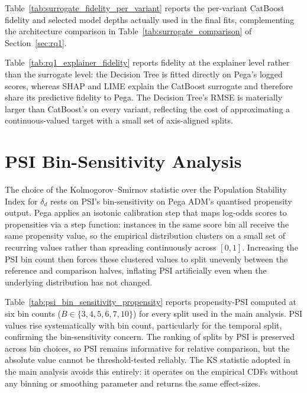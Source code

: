 \documentclass[oneside]{memoir} %
\begin{document}
Table~\ref{tab:surrogate_fidelity_per_variant} reports the per-variant CatBoost fidelity and selected model depths actually used in the final fits, complementing the architecture comparison in Table~\ref{tab:surrogate_comparison} of Section~\ref{sec:rq1}.



Table~\ref{tab:rq1_explainer_fidelity} reports fidelity at the explainer level rather than the surrogate level: the Decision Tree is fitted directly on Pega's logged scores, whereas SHAP and LIME explain the CatBoost surrogate and therefore share its predictive fidelity to Pega. The Decision Tree's RMSE is materially larger than CatBoost's on every variant, reflecting the cost of approximating a continuous-valued target with a small set of axis-aligned splits.



\section{PSI Bin-Sensitivity Analysis} \label{app:psi_sensitivity}

The choice of the Kolmogorov--Smirnov statistic over the Population Stability Index for $\delta_d$ rests on PSI's bin-sensitivity on Pega ADM's quantised propensity output. Pega applies an isotonic calibration step that maps log-odds scores to propensities via a step function: instances in the same score bin all receive the same propensity value, so the empirical distribution clusters on a small set of recurring values rather than spreading continuously across $[0, 1]$. Increasing the PSI bin count then forces these clustered values to split unevenly between the reference and comparison halves, inflating PSI artificially even when the underlying distribution has not changed.

Table~\ref{tab:psi_bin_sensitivity_propensity} reports propensity-PSI computed at six bin counts ($B \in \{3, 4, 5, 6, 7, 10\}$) for every split used in the main analysis. PSI values rise systematically with bin count, particularly for the temporal split, confirming the bin-sensitivity concern. The ranking of splits by PSI is preserved across bin choices, so PSI remains informative for relative comparison, but the absolute value cannot be threshold-tested reliably. The KS statistic adopted in the main analysis avoids this entirely: it operates on the empirical CDFs without any binning or smoothing parameter and returns the same effect-sizes.
\end{document}
